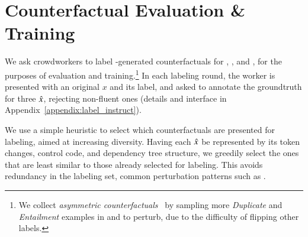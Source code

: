 \section{Counterfactual Evaluation \& Training}
\label{sec:app_label}

We ask crowdworkers to label \sysname-generated counterfactuals for \sst, \nli, and \qqp, for the purposes of evaluation and training.\footnote{We collect \emph{asymmetric counterfactuals}~\cite{garg2019counterfactual} by sampling more \emph{Duplicate} and \emph{Entailment} examples in \qqp and \nli to perturb, due to the difficulty of flipping other labels.} 
In each labeling round, the worker is presented with an original $x$ and its label, and asked to annotate the groundtruth for three $\hat{x}$, rejecting non-fluent ones (details and interface in Appendix~\ref{appendix:label_instruct}).

We use a simple heuristic to select which counterfactuals are presented for labeling, aimed at increasing diversity. 
Having each $\hat{x}$ be represented by its token changes, control code, and dependency tree structure, we greedily select the ones that are least similar to those already selected for labeling. 
This avoids redundancy in the labeling set, \eg common perturbation patterns such as .


